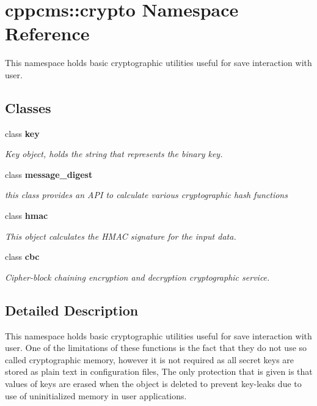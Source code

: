 \section{cppcms\-:\-:crypto Namespace Reference}
\label{namespacecppcms_1_1crypto}


This namespace holds basic cryptographic utilities useful for save interaction with user.  


\subsection*{Classes}
\begin{DoxyCompactItemize}
\item 
class {\bf key}
\begin{DoxyCompactList}\small\item\em Key object, holds the string that represents the binary key. \end{DoxyCompactList}\item 
class {\bf message\-\_\-digest}
\begin{DoxyCompactList}\small\item\em this class provides an A\-P\-I to calculate various cryptographic hash functions \end{DoxyCompactList}\item 
class {\bf hmac}
\begin{DoxyCompactList}\small\item\em This object calculates the H\-M\-A\-C signature for the input data. \end{DoxyCompactList}\item 
class {\bf cbc}
\begin{DoxyCompactList}\small\item\em Cipher-\/block chaining encryption and decryption cryptographic service. \end{DoxyCompactList}\end{DoxyCompactItemize}


\subsection{Detailed Description}
This namespace holds basic cryptographic utilities useful for save interaction with user. One of the limitations of these functions is the fact that they do not use so called cryptographic memory, however it is not required as all secret keys are stored as plain text in configuration files, The only protection that is given is that values of keys are erased when the object is deleted to prevent key-\/leaks due to use of uninitialized memory in user applications. 